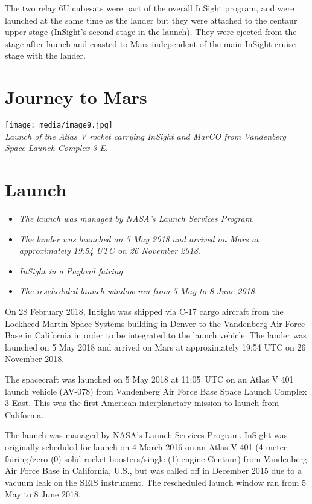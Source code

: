 The two relay 6U cubesats were part of the overall InSight program, and
were launched at the same time as the lander but they were attached to
the centaur upper stage (InSight's second stage in the launch). They
were ejected from the stage after launch and coasted to Mars independent
of the main InSight cruise stage with the lander.

\section{Journey to Mars}\label{journey-to-mars}

\texttt{[image: media/image9.jpg]}\\
\emph{Launch of the Atlas V rocket carrying InSight and MarCO from
Vandenberg Space Launch Complex 3-E.}

\section{Launch}\label{launch}

\begin{itemize}
\item
  \emph{The launch was managed by NASA's Launch Services Program.}
\item
  \emph{The lander was launched on 5 May 2018 and arrived on Mars at
  approximately 19:54 UTC on 26 November 2018.}
\item
  \emph{InSight in a Payload fairing}
\item
  \emph{The rescheduled launch window ran from 5 May to 8 June 2018.}
\end{itemize}

On 28 February 2018, InSight was shipped via C-17 cargo aircraft from
the Lockheed Martin Space Systems building in Denver to the Vandenberg
Air Force Base in California in order to be integrated to the launch
vehicle. The lander was launched on 5 May 2018 and arrived on Mars at
approximately 19:54 UTC on 26 November 2018.

The spacecraft was launched on 5 May 2018 at 11:05~UTC on an Atlas V 401
launch vehicle (AV-078) from Vandenberg Air Force Base Space Launch
Complex 3-East. This was the first American interplanetary mission to
launch from California.

The launch was managed by NASA's Launch Services Program. InSight was
originally scheduled for launch on 4 March 2016 on an Atlas V 401 (4
meter fairing/zero (0) solid rocket boosters/single (1) engine Centaur)
from Vandenberg Air Force Base in California, U.S., but was called off
in December 2015 due to a vacuum leak on the SEIS instrument. The
rescheduled launch window ran from 5 May to 8 June 2018.

